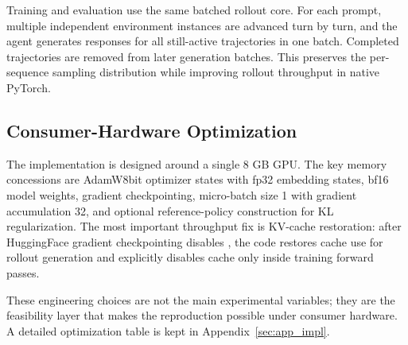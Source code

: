 Training and evaluation use the same batched rollout core. For each prompt, multiple independent environment instances are advanced turn by turn, and the agent generates responses for all still-active trajectories in one batch. Completed trajectories are removed from later generation batches. This preserves the per-sequence sampling distribution while improving rollout throughput in native PyTorch.

\subsection{Consumer-Hardware Optimization}

The implementation is designed around a single 8 GB GPU. The key memory concessions are AdamW8bit optimizer states with fp32 embedding states, bf16 model weights, gradient checkpointing, micro-batch size 1 with gradient accumulation 32, and optional reference-policy construction for KL regularization. The most important throughput fix is KV-cache restoration: after HuggingFace gradient checkpointing disables , the code restores cache use for rollout generation and explicitly disables cache only inside training forward passes.

These engineering choices are not the main experimental variables; they are the feasibility layer that makes the reproduction possible under consumer hardware. A detailed optimization table is kept in Appendix~\ref{sec:app_impl}.
